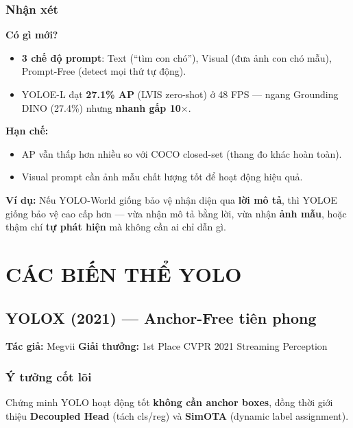 \documentclass[12pt,a4paper]{report}
\begin{document}
\subsection{Nhận xét}

\textbf{Có gì mới?}
\begin{itemize}
    \item \textbf{3 chế độ prompt}: Text (``tìm con chó''), Visual (đưa ảnh con chó mẫu), Prompt-Free (detect mọi thứ tự động).
    \item YOLOE-L đạt \textbf{27.1\% AP} (LVIS zero-shot) ở 48 FPS --- ngang Grounding DINO (27.4\%) nhưng \textbf{nhanh gấp 10$\times$}.
\end{itemize}

\textbf{Hạn chế:}
\begin{itemize}
    \item AP vẫn thấp hơn nhiều so với COCO closed-set (thang đo khác hoàn toàn).
    \item Visual prompt cần ảnh mẫu chất lượng tốt để hoạt động hiệu quả.
\end{itemize}

\textbf{Ví dụ:} Nếu YOLO-World giống bảo vệ nhận diện qua \textbf{lời mô tả}, thì YOLOE giống bảo vệ cao cấp hơn --- vừa nhận mô tả bằng lời, vừa nhận \textbf{ảnh mẫu}, hoặc thậm chí \textbf{tự phát hiện} mà không cần ai chỉ dẫn gì.



\chapter{CÁC BIẾN THỂ YOLO}

\section{YOLOX (2021) --- Anchor-Free tiên phong}
\textbf{Tác giả:} Megvii \hfill \textbf{Giải thưởng:} 1st Place CVPR 2021 Streaming Perception

\subsection{Ý tưởng cốt lõi}
Chứng minh YOLO hoạt động tốt \textbf{không cần anchor boxes}, đồng thời giới thiệu \textbf{Decoupled Head} (tách cls/reg) và \textbf{SimOTA} (dynamic label assignment).
\end{document}
